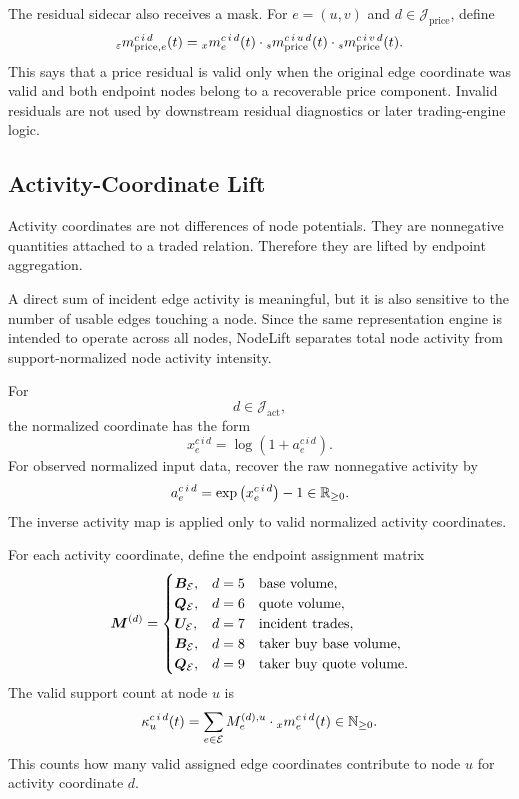 The residual sidecar also receives a mask.  For $e=(u,v)$ and
$d\in\mathcal{J}_{\mathrm{price}}$, define
\[
  {}_{\varepsilon}m_{\mathrm{price},e}^{c\,i\,d}(t)
  =
  {}_{x}m_{e}^{c\,i\,d}(t)
  \cdot
  {}_{s}m_{\mathrm{price}}^{c\,i\,u\,d}(t)
  \cdot
  {}_{s}m_{\mathrm{price}}^{c\,i\,v\,d}(t).
\]
This says that a price residual is valid only when the original edge coordinate
was valid and both endpoint nodes belong to a recoverable price component.
Invalid residuals are not used by downstream residual diagnostics or later
trading-engine logic.

\subsection{Activity-Coordinate Lift}
\label{subsec:activity-coordinate-lift}

Activity coordinates are not differences of node potentials.  They are
nonnegative quantities attached to a traded relation.  Therefore they are lifted
by endpoint aggregation.

A direct sum of incident edge activity is meaningful, but it is also sensitive
to the number of usable edges touching a node.  Since the same representation
engine is intended to operate across all nodes, NodeLift separates total node
activity from support-normalized node activity intensity.

For
\[
  d\in\mathcal{J}_{\mathrm{act}},
\]
the normalized coordinate has the form
\[
  x_{e}^{c\,i\,d}
  =
  \log
  \left(
    1+a_{e}^{c\,i\,d}
  \right).
\]
For observed normalized input data, recover the raw nonnegative activity by
\[
  a_{e}^{c\,i\,d}
  =
  \exp
  \left(
    x_{e}^{c\,i\,d}
  \right)
  -
  1
  \in
  \mathbb{R}_{\ge 0}.
\]
The inverse activity map is applied only to valid normalized activity
coordinates.

For each activity coordinate, define the endpoint assignment matrix
\[
  \bm{M}^{(d)}
  =
  \begin{cases}
    \bm{B}_{\mathcal{E}}, & d=5 \quad \text{base volume},\\
    \bm{Q}_{\mathcal{E}}, & d=6 \quad \text{quote volume},\\
    \bm{U}_{\mathcal{E}}, & d=7 \quad \text{incident trades},\\
    \bm{B}_{\mathcal{E}}, & d=8 \quad \text{taker buy base volume},\\
    \bm{Q}_{\mathcal{E}}, & d=9 \quad \text{taker buy quote volume}.
  \end{cases}
\]
The valid support count at node $u$ is
\[
  \kappa_{u}^{c\,i\,d}(t)
  =
  \sum_{e\in\mathcal{E}}
  M_{e}^{(d),u}
  \cdot
  {}_{x}m_{e}^{c\,i\,d}(t)
  \in
  \mathbb{N}_{\ge 0}.
\]
This counts how many valid assigned edge coordinates contribute to node $u$ for
activity coordinate $d$.

